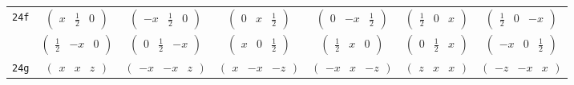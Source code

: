 \documentclass[fleqn,9pt,landscape]{jsarticle}
\begin{document}
\begin{center}
\begin{longtable}{ccccccc}
{\tt 24f} & $ \begin{pmatrix} x & \frac{1}{2} & 0 \end{pmatrix} $ & $ \begin{pmatrix} - x & \frac{1}{2} & 0 \end{pmatrix} $ & $ \begin{pmatrix} 0 & x & \frac{1}{2} \end{pmatrix} $ & $ \begin{pmatrix} 0 & - x & \frac{1}{2} \end{pmatrix} $ & $ \begin{pmatrix} \frac{1}{2} & 0 & x \end{pmatrix} $ & $ \begin{pmatrix} \frac{1}{2} & 0 & - x \end{pmatrix} $ \\
& $ \begin{pmatrix} \frac{1}{2} & - x & 0 \end{pmatrix} $ & $ \begin{pmatrix} 0 & \frac{1}{2} & - x \end{pmatrix} $ & $ \begin{pmatrix} x & 0 & \frac{1}{2} \end{pmatrix} $ & $ \begin{pmatrix} \frac{1}{2} & x & 0 \end{pmatrix} $ & $ \begin{pmatrix} 0 & \frac{1}{2} & x \end{pmatrix} $ & $ \begin{pmatrix} - x & 0 & \frac{1}{2} \end{pmatrix} $ \\ \hline
{\tt 24g} & $ \begin{pmatrix} x & x & z \end{pmatrix} $ & $ \begin{pmatrix} - x & - x & z \end{pmatrix} $ & $ \begin{pmatrix} x & - x & - z \end{pmatrix} $ & $ \begin{pmatrix} - x & x & - z \end{pmatrix} $ & $ \begin{pmatrix} z & x & x \end{pmatrix} $ & $ \begin{pmatrix} - z & - x & x \end{pmatrix} $ \\

\end{longtable}
\end{center}
\end{document}
